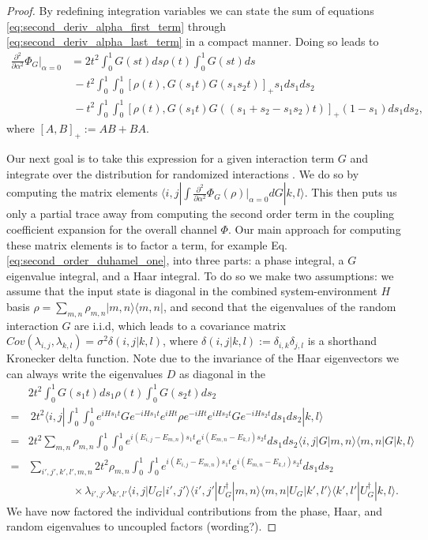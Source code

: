 \documentclass{article}
\newcommand{\ket}[1]{|#1\rangle}
\newcommand{\bra}[1]{\langle #1|}
\newcommand{\ketbra}[2]{| #1\rangle\! \langle #2|}
\newcommand{\brackets}[1]{\left[ #1 \right]}
\begin{document}
\begin{proof}
By redefining integration variables we can state the sum of equations  \eqref{eq:second_deriv_alpha_first_term} through \eqref{eq:second_deriv_alpha_last_term} in a compact manner. Doing so leads to
\begin{align}
    \frac{\partial^2}{\partial \alpha^2} \Phi_G \bigg|_{\alpha = 0} &= 2 t^2 \int_0^1 G(st) ds \rho(t) \int_0^1 G(st) ds \label{eq:second_order_duhamel_one} \\
    &~ - t^2 \int_0^1 \int_0^1 \brackets{\rho(t) , G(s_1 t) G(s_1 s_2 t)}_+ s_1 ds_1 ds_2 \label{eq:second_order_duhamel_two}  \\
    &~ - t^2 \int_0^1 \int_0^1 \brackets{ \rho(t), G(s_1 t) G((s_1 + s_2 - s_1 s_2) t) }_+ (1-s_1) ds_1 ds_2, \label{eq:second_order_duhamel_three} 
\end{align}
where $[A,B]_+ := AB + BA$.

Our next goal is to take this expression for a given interaction term $G$ and integrate over the distribution for randomized interactions .
We do so by computing the matrix elements $\bra{i,j} \int \frac{\partial^2}{\partial \alpha^2} \Phi_G(\rho) \big|_{\alpha = 0} dG \ket{k,l}$. This then puts us only a partial trace away from computing the second order term in the coupling coefficient expansion for the overall channel $\Phi$. Our main approach for computing these matrix elements is to factor a term, for example Eq. \eqref{eq:second_order_duhamel_one}, into three parts: a phase integral, a $G$ eigenvalue integral, and a Haar integral. To do so we make two assumptions: we assume that the input state is diagonal in the combined system-environment $H$ basis $\rho = \sum_{m,n} \rho_{m,n} \ketbra{m,n}{m,n}$, and second that the eigenvalues of the random interaction $G$ are i.i.d, which leads to a covariance matrix $Cov(\lambda_{i,j}, \lambda_{k,l}) = \sigma^2 \delta(i,j | k,l)$, where $\delta(i,j | k,l) := \delta_{i,k} \delta_{j,l}$ is a shorthand Kronecker delta function. Note due to the invariance of the Haar eigenvectors we can always write the eigenvalues $D$ as diagonal in the 
\begin{align}
    &2t^2 \int_0^1 G(s_1t) ds_1 \rho(t) \int_0^1 G(s_2 t) ds_2 \\
    =&~ 2 t^2 \bra{i,j} \int_{0}^1 \int_0^1 e^{i H s_1 t} G e^{-iH s_1 t} e^{i H t} \rho e^{-i H t} e^{i H s_2 t} G e^{-iH s_2 t} ds_1 ds_2 \ket{k,l} \\
    =& 2 t^2 \sum_{m,n} \rho_{m,n} \int_0^1 \int_0^1 e^{i(E_{i,j} - E_{m,n})s_1 t} e^{i(E_{m,n} - E_{k,l}) s_2 t} ds_1 ds_2 \bra{i,j}G \ketbra{m,n}{m,n} G \ket{k,l} \\
    =& \sum_{i',j',k',l',m,n} 2t^2 \rho_{m,n} \int_0^1 \int_0^1 e^{i(E_{i,j} - E_{m,n})s_1 t} e^{i(E_{m,n} - E_{k,l}) s_2 t} ds_1 ds_2 \nonumber \\
     &\quad \quad \quad \quad \times \lambda_{i',j'} \lambda_{k',l'} \bra{i,j} U_G \ket{i',j'} \bra{i',j'} U_G^\dagger \ket{m,n} \bra{m,n} U_G \ket{k',l'} \bra{k',l'} U_G^\dagger \ket{k,l}.
\end{align}
We have now factored the individual contributions from the phase, Haar, and random eigenvalues to uncoupled factors (wording?). 


\end{proof}
\end{document}
